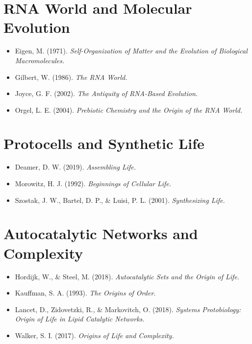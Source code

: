 \documentclass[
  oneside,
  openany]{book}
\providecommand{\tightlist}{%
  \setlength{\itemsep}{0pt}\setlength{\parskip}{0pt}}
\begin{document}
\section{RNA World and Molecular Evolution}\label{rna-world-and-molecular-evolution}

\begin{itemize}
\tightlist
\item
  Eigen, M. (1971). \emph{Self-Organization of Matter and the Evolution of Biological Macromolecules.}
\item
  Gilbert, W. (1986). \emph{The RNA World.}
\item
  Joyce, G. F. (2002). \emph{The Antiquity of RNA-Based Evolution.}
\item
  Orgel, L. E. (2004). \emph{Prebiotic Chemistry and the Origin of the RNA World.}
\end{itemize}

\section{Protocells and Synthetic Life}\label{protocells-and-synthetic-life}

\begin{itemize}
\tightlist
\item
  Deamer, D. W. (2019). \emph{Assembling Life.}
\item
  Morowitz, H. J. (1992). \emph{Beginnings of Cellular Life.}
\item
  Szostak, J. W., Bartel, D. P., \& Luisi, P. L. (2001). \emph{Synthesizing Life.}
\end{itemize}

\section{Autocatalytic Networks and Complexity}\label{autocatalytic-networks-and-complexity}

\begin{itemize}
\tightlist
\item
  Hordijk, W., \& Steel, M. (2018). \emph{Autocatalytic Sets and the Origin of Life.}
\item
  Kauffman, S. A. (1993). \emph{The Origins of Order.}
\item
  Lancet, D., Zidovetzki, R., \& Markovitch, O. (2018). \emph{Systems Protobiology: Origin of Life in Lipid Catalytic Networks.}
\item
  Walker, S. I. (2017). \emph{Origins of Life and Complexity.}
\end{itemize}
\end{document}
